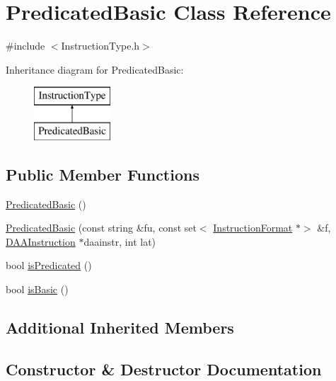 \hypertarget{classPredicatedBasic}{}\section{Predicated\+Basic Class Reference}
\label{classPredicatedBasic}


{\ttfamily \#include $<$Instruction\+Type.\+h$>$}

Inheritance diagram for Predicated\+Basic\+:\begin{figure}[H]
\begin{center}
\leavevmode
\includegraphics[height=2.000000cm]{classPredicatedBasic}
\end{center}
\end{figure}
\subsection*{Public Member Functions}
\begin{DoxyCompactItemize}
\item 
\hyperlink{classPredicatedBasic_ae4e8193a68972eccd8eb23b7d3f23c27}{Predicated\+Basic} ()
\item 
\hyperlink{classPredicatedBasic_a4c246f86d2d5b6239fa61e9ef8abeec8}{Predicated\+Basic} (const string \&fu, const set$<$ \hyperlink{classInstructionFormat}{Instruction\+Format} $\ast$$>$ \&f, \hyperlink{classDAAInstruction}{D\+A\+A\+Instruction} $\ast$daainstr, int lat)
\item 
bool \hyperlink{classPredicatedBasic_aa63e9f18308f45cc3f74e27d9db3ef29}{is\+Predicated} ()
\item 
bool \hyperlink{classPredicatedBasic_ad3f2e7d2feaef666dd784fcae0f03125}{is\+Basic} ()
\end{DoxyCompactItemize}
\subsection*{Additional Inherited Members}


\subsection{Constructor \& Destructor Documentation}
\mbox{\label{classPredicatedBasic_ae4e8193a68972eccd8eb23b7d3f23c27}} 
